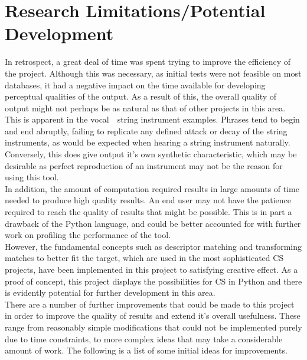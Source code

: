 \documentclass{scrartcl}
\begin{document}
    \section*{Research Limitations/Potential Development}
    In retrospect, a great deal of time was spent trying to improve the
    efficiency of the project. Although this was necessary, as initial tests
    were not feasible on most databases, it had a negative impact on the time
    available for developing perceptual qualities of the output. As a result of
    this, the overall quality of output might not perhaps be as natural as that
    of other projects in this area. This is apparent in the
    vocal~\textrightarrow~string instrument examples. Phrases tend to begin and
    end abruptly, failing to replicate any defined attack or decay of the
    string instruments, as would be expected when hearing a string instrument
    naturally. Conversely, this does give output it's own synthetic
    characteristic, which may be desirable as perfect reproduction of an
    instrument may not be the reason for using this tool.\\
    In addition, the amount of computation required results in large amounts of time
    needed to produce high quality results. An end user may not have the
    patience required to reach the quality of results that might be
    possible. This is in part a drawback of the Python language, and could be
    better accounted for with further work on profiling the performance of the
    tool.\\
    However, the fundamental concepts such as descriptor matching and
    transforming matches to better fit the target, which are used in the most
    sophisticated CS projects, have been implemented in this project to
    satisfying creative effect. As a proof of concept, this project displays
    the possibilities for CS in Python and there is evidently potential for
    further development in this area.\\

    There are a number of further improvements that could be made to this
    project in order to improve the quality of results and extend it's overall
    usefulness. These range from reasonably simple modifications that could not
    be implemented purely due to time constraints, to more complex ideas that
    may take a considerable amount of work. The following is a list of some
    initial ideas for improvements.\\
\end{document}
